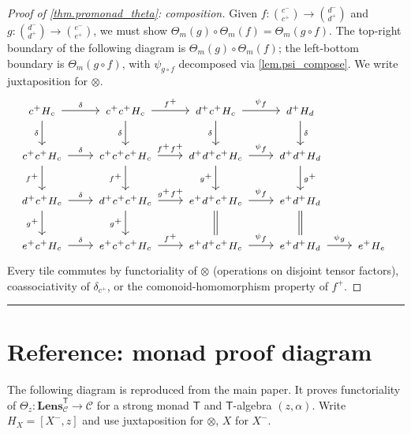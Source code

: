 \documentclass[11pt]{article}
\theoremstyle{definition}
\newcommand{\outp}[1]{#1^{+}}
\newcommand{\inpt}[1]{#1^{-}}
\newcommand{\lensob}[1]{\binom{\inpt{#1}}{\outp{#1}}}
\newcommand{\cat}[1]{\mathcal{#1}}
\newcommand{\Cat}[1]{\mathbf{#1}}
\newcommand{\Fun}[1]{\textsf{#1}}
\newcommand{\Lens}[1]{\Cat{Lens}_{#1}}
\newcommand{\ihom}[2]{[#1,#2]}
\begin{document}
\begin{proof}[Proof of \cref{thm.promonad_theta}: composition]
Given $f\colon\lensob{c}\to\lensob{d}$ and $g\colon\lensob{d}\to\lensob{e}$, we must show $\Theta_m(g)\circ\Theta_m(f)=\Theta_m(g\circ f)$. The top-right boundary of the following diagram is $\Theta_m(g)\circ\Theta_m(f)$; the left-bottom boundary is $\Theta_m(g\circ f)$, with $\psi_{g\circ f}$ decomposed via \cref{lem.psi_compose}. We write juxtaposition for $\otimes$.
\[
\resizebox{\linewidth}{!}{%
\begin{tikzcd}[column sep=1.8em, row sep=1.8em, every label/.append style={font=\tiny}, font=\scriptsize, ampersand replacement=\&]
\outp c H_c
  \ar[r, "{\delta}"]
  \ar[d, "{\delta}"']
\& \outp c\outp c H_c \ar[r, "{\outp f}"] \ar[d, "{\delta}"']
\& \outp d\outp c H_c \ar[r, "{\psi_f}"] \ar[d, "{\delta}"']
\& \outp d H_d \ar[d, "{\delta}"]
\\
\outp c\outp c H_c \ar[d, "{\outp f}"'] \ar[r, "{\delta}"]
\& \outp c\outp c\outp c H_c \ar[r, "{\outp f\outp f}"] \ar[d, "{\outp f}"']
\& \outp d\outp d\outp c H_c \ar[r, "{\psi_f}"] \ar[d, "{\outp g}"']
\& \outp d\outp d H_d \ar[d, "{\outp g}"]
\\
\outp d\outp c H_c \ar[d, "{\outp g}"'] \ar[r, "{\delta}"]
\& \outp d\outp c\outp c H_c \ar[r, "{\outp g\outp f}"] \ar[d, "{\outp g}"']
\& \outp e\outp d\outp c H_c \ar[r, "{\psi_f}"] \ar[d, equal]
\& \outp e\outp d H_d \ar[d, equal]
\\
\outp e\outp c H_c \ar[r, "{\delta}"]
\& \outp e\outp c\outp c H_c \ar[r, "{\outp f}"]
\& \outp e\outp d\outp c H_c \ar[r, "{\psi_f}"]
\& \outp e\outp d H_d \ar[r, "{\psi_g}"]
\& \outp e H_e
\end{tikzcd}
}
\]
Every tile commutes by functoriality of $\otimes$ (operations on disjoint tensor factors), coassociativity of $\delta_{\outp{c}}$, or the comonoid-homomorphism property of $\outp{f}$.
\end{proof}

\bigskip
\hrule
\bigskip

\section{Reference: monad proof diagram}\label{page.ref_diagram}

The following diagram is reproduced from the main paper. It proves functoriality of $\Theta_z\colon\Lens{\cat{C}}^{\Fun{T}}\to\cat{C}$ for a strong monad $\Fun{T}$ and $\Fun{T}$-algebra $(z,\alpha)$. Write $H_X=\ihom{\inpt{X}}{z}$ and use juxtaposition for $\otimes$, $X$ for $\inpt{X}$.
\end{document}
